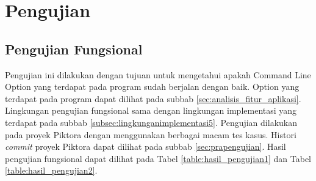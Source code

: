 \section{Pengujian}
\label{sec:pengujian}

\subsection{Pengujian Fungsional}
\label{sec:pengujian_fungsional} 
Pengujian ini dilakukan dengan tujuan untuk mengetahui apakah Command Line Option yang terdapat pada program sudah berjalan dengan baik. Option yang terdapat pada program dapat dilihat pada subbab \ref{sec:analisis_fitur_aplikasi}. Lingkungan pengujian fungsional sama dengan lingkungan implementasi yang terdapat pada subbab \ref{subsec:lingkunganimplementasi5}. Pengujian dilakukan pada proyek Piktora dengan menggunakan berbagai macam tes kasus. Histori \textit{commit} proyek Piktora dapat dilihat pada subbab \ref{sec:prapengujian}. Hasil pengujian fungsional dapat dilihat pada Tabel \ref{table:hasil_pengujian1} dan Tabel \ref{table:hasil_pengujian2}.


